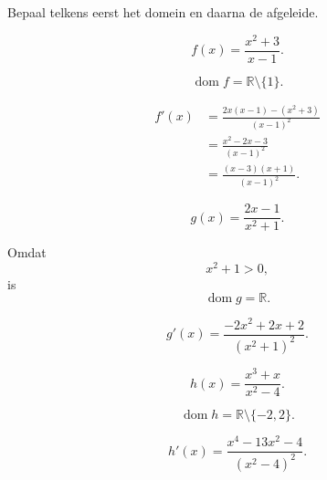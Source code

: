 \documentclass{ximera}
\begin{document}
\begin{oefening}[Quotiëntregel]{\oefB\ESS}

Bepaal telkens eerst het domein en daarna de afgeleide.

\begin{question}
\[
f(x)=\frac{x^2+3}{x-1}.
\]

\begin{oplossing}
\[
\operatorname{dom}f=\mathbb{R}\setminus\{1\}.
\]

\[
\begin{aligned}
f'(x)
&=
\frac{2x(x-1)-(x^2+3)}{(x-1)^2}\\
&=
\frac{x^2-2x-3}{(x-1)^2}\\
&=
\frac{(x-3)(x+1)}{(x-1)^2}.
\end{aligned}
\]
\end{oplossing}
\end{question}


\begin{question}
\[
g(x)=\frac{2x-1}{x^2+1}.
\]

\begin{oplossing}
Omdat
\[
x^2+1>0,
\]
is
\[
\operatorname{dom}g=\mathbb{R}.
\]

\[
g'(x)
=
\frac{-2x^2+2x+2}{(x^2+1)^2}.
\]
\end{oplossing}
\end{question}


\begin{question}
\[
h(x)=\frac{x^3+x}{x^2-4}.
\]

\begin{oplossing}
\[
\operatorname{dom}h
=
\mathbb{R}\setminus\{-2,2\}.
\]

\[
h'(x)
=
\frac{x^4-13x^2-4}{(x^2-4)^2}.
\]
\end{oplossing}
\end{question}

\end{oefening}


\end{document}
